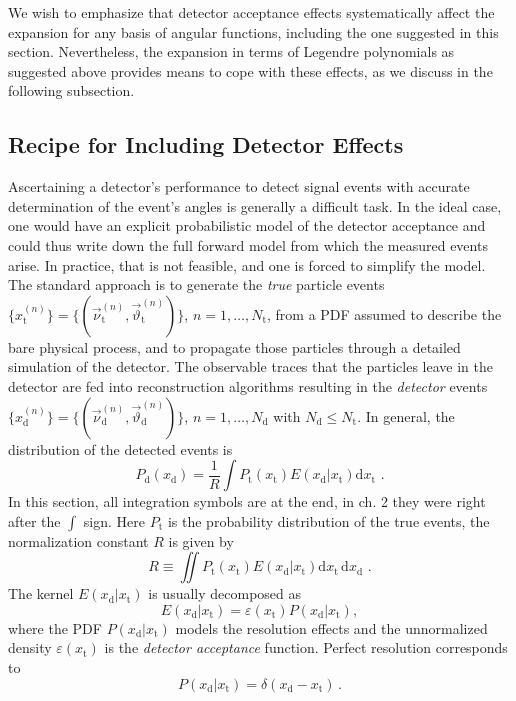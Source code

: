 \documentclass[aps,prd,reprint,nofootinbib,preprintnumbers]{revtex4}
\newcommand{\rmdx}[1]{\mbox{d} #1 \,} %
\newcommand{\subd}{_{\text{d}}}
\newcommand{\subt}{_{\text{t}}}
\renewcommand{\theta}{\vartheta}
\let\eps\varepsilon
\newcommand{\xd}{x\subd}
\newcommand{\xt}{x\subt}
\newcommand{\Ekernel}{E(\xd|\xt)}
\newcommand{\fred}[1]{{\color{brown!85!black}#1}}
\begin{document}
We wish to emphasize that detector acceptance effects systematically affect the expansion for any basis
of angular functions, including the one suggested in this section.
Nevertheless, the expansion in terms of Legendre polynomials as suggested above provides means to cope with these effects,
as we discuss in the following subsection.


\subsection{Recipe for Including Detector Effects}
\label{sec:systematics:acceptance}

\fred{Ascertaining} a detector's performance to detect signal events
with accurate determination of the event's angles is generally a
difficult task. In the ideal case, one would have an explicit
probabilistic model of the detector acceptance and could thus
write down the full forward model from which the measured events
arise. In practice, that is not feasible, and one is
forced to simplify the model.
The standard approach is to generate the \emph{true} particle events
$\lbrace x_\text{t}^{(n)}\rbrace =
\lbrace(\vec{\nu}^{(n)}_\text{t},\vec\theta^{(n)}_\text{t})\rbrace$,
$n=1,\dots,N_\text{t}$, from a PDF assumed to describe the bare
physical process, and to propagate those particles through a detailed
simulation of the detector.  The observable traces that the particles
leave in the detector are fed into reconstruction algorithms resulting
in the \emph{detector} events $\lbrace x^{(n)}_\text{d}\rbrace =
\lbrace(\vec{\nu}^{(n)}_\text{d}, \vec\theta^{(n)}_\text{d})\rbrace$,
$n=1,\dots,N_\text{d}$ with $N_\text{d} \le N_\text{t}$.  In general,
the distribution of the detected events is
\begin{equation}
    P_\text{d}(x_\text{d}) = \frac{1}{R} \int P_\text{t}(x_\text{t}) E(x_\text{d} | x_\text{t}) \rmdx{x_\text{t}}\,.
\end{equation}
\fred{In this section, all integration symbols are at the end, in ch. 2 they were right after the $\int$ sign.}
Here $P_\text{t}$ is the probability distribution of the true events,
the normalization constant $R$ is given by
\begin{equation}
  \label{eq:def-R}
    R \equiv \iint P_\text{t}(x_\text{t}) E(x_\text{d} | x_\text{t}) \rmdx{x_\text{t}} \rmdx{x_\text{d}}\,.
\end{equation}
The kernel $E(x_\text{d}| x_\text{t})$ is usually decomposed as
\begin{equation}
  \Ekernel = \eps(\xt) P(\xd|\xt),
\end{equation}
where the PDF $P(\xd|\xt)$ models the resolution effects and the
unnormalized density $\eps(\xt)$ is the \emph{detector acceptance}
function. Perfect resolution corresponds to
\begin{equation}
  P(\xd|\xt) = \delta(\xd - \xt) \,.
\end{equation}
\end{document}
